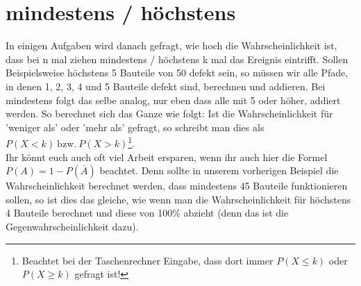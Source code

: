 \section{mindestens / höchstens}
	In einigen Aufgaben wird danach gefragt, wie hoch die Wahrscheinlichkeit ist,
	dass bei n mal ziehen mindestens / höchstens k mal das Ereignis eintrifft.
	Sollen Beispielsweise höchstens 5 Bauteile von 50 defekt sein, so müssen wir
	alle Pfade, in denen 1, 2, 3, 4 und 5 Bauteile defekt sind, berechnen und
	addieren. Bei mindestens folgt das selbe analog, nur eben dass alle mit 5 oder
	höher, addiert werden. So berechnet sich das Ganze wie folgt:
	\formel{\[\mathrm{\underline{Höchstens}: }P(X\leq k)=P(X=0)+P(X=1)+\ldots
	+P(X=k)\]
	\[\mathrm{\underline{Mindestens}: }P(X\geq k)=P(X=k)+P(X=k+1)+\ldots+P(X=n)\]}
	Ist die Wahrscheinlichkeit für 'weniger als' oder 'mehr als' gefragt, so
	schreibt man dies als \(P(X<k)\mathrm{\ bzw.\ }P(X>k)\)\footnote{Beachtet bei
	der Taschenrechner Eingabe, dass dort immer $P(X\leq k)$ oder $P(X\geq k)$
	gefragt ist!}.\\
	Ihr könnt euch auch oft viel Arbeit ersparen, wenn ihr auch hier die Formel
	\(P(A)=1-P(\overline{A})\) beachtet. Denn sollte in unserem vorherigen Beispiel
	die Wahrscheinlichkeit berechnet werden, dass mindestens 45 Bauteile
	funktionieren sollen, so ist dies das gleiche, wie wenn man die
	Wahrscheinlichkeit für höchstens 4 Bauteile berechnet und diese von 100\%
	abzieht (denn das ist die Gegenwahrscheinlichkeit dazu).
